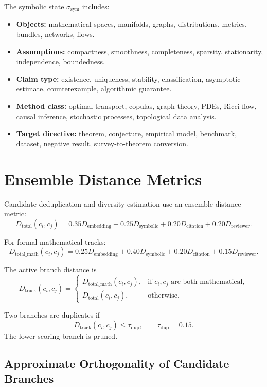 \documentclass[11pt]{article}
\begin{document}
The symbolic state $\sigma_{\text{sym}}$ includes:
\begin{itemize}[leftmargin=*]
\item \textbf{Objects:} mathematical spaces, manifolds, graphs, distributions, metrics, bundles, networks, flows.
\item \textbf{Assumptions:} compactness, smoothness, completeness, sparsity, stationarity, independence, boundedness.
\item \textbf{Claim type:} existence, uniqueness, stability, classification, asymptotic estimate, counterexample, algorithmic guarantee.
\item \textbf{Method class:} optimal transport, copulas, graph theory, PDEs, Ricci flow, causal inference, stochastic processes, topological data analysis.
\item \textbf{Target directive:} theorem, conjecture, empirical model, benchmark, dataset, negative result, survey-to-theorem conversion.
\end{itemize}

\section{Ensemble Distance Metrics}

Candidate deduplication and diversity estimation use an ensemble distance metric:
$$
D_{\text{total}}(c_i,c_j) = 0.35D_{\text{embedding}} + 0.25D_{\text{symbolic}} + 0.20D_{\text{citation}} + 0.20D_{\text{reviewer}}.
$$

For formal mathematical tracks:
$$
D_{\text{total\_math}}(c_i,c_j) = 0.25D_{\text{embedding}} + 0.40D_{\text{symbolic}} + 0.20D_{\text{citation}} + 0.15D_{\text{reviewer}}.
$$

The active branch distance is
$$
D_{\text{track}}(c_i,c_j)=
\begin{cases}
D_{\text{total\_math}}(c_i,c_j), & \text{if } c_i,c_j \text{ are both mathematical},\\
D_{\text{total}}(c_i,c_j), & \text{otherwise}.
\end{cases}
$$

Two branches are duplicates if
$$
D_{\text{track}}(c_i,c_j)\leq \tau_{\text{dup}}, \qquad \tau_{\text{dup}}=0.15.
$$
The lower-scoring branch is pruned.

\subsection{Approximate Orthogonality of Candidate Branches}
\end{document}
